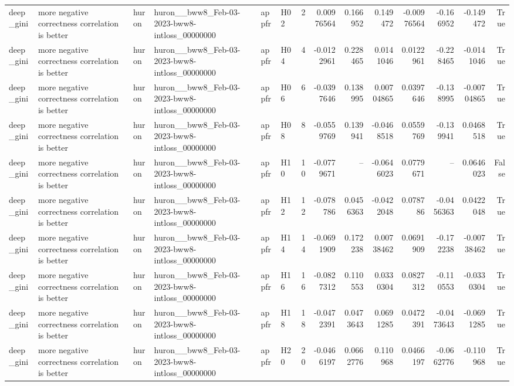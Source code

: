 \begin{longtable}{llllllrrrrrrrr}
deep\_gini & more negative correctness correlation is better & huron & huron\_\_bww8\_Feb-03-2023-bww8-intloss\_00000000 & appfr & H02 & 2 & 0.00976564 & 0.166952 & 0.149472 & -0.00976564 & -0.166952 & -0.149472 & True \\
deep\_gini & more negative correctness correlation is better & huron & huron\_\_bww8\_Feb-03-2023-bww8-intloss\_00000000 & appfr & H04 & 4 & -0.0122961 & 0.228465 & 0.0141046 & 0.0122961 & -0.228465 & -0.0141046 & True \\
deep\_gini & more negative correctness correlation is better & huron & huron\_\_bww8\_Feb-03-2023-bww8-intloss\_00000000 & appfr & H06 & 6 & -0.0397646 & 0.138995 & 0.00704865 & 0.0397646 & -0.138995 & -0.00704865 & True \\
deep\_gini & more negative correctness correlation is better & huron & huron\_\_bww8\_Feb-03-2023-bww8-intloss\_00000000 & appfr & H08 & 8 & -0.0559769 & 0.139941 & -0.0468518 & 0.0559769 & -0.139941 & 0.0468518 & True \\
deep\_gini & more negative correctness correlation is better & huron & huron\_\_bww8\_Feb-03-2023-bww8-intloss\_00000000 & appfr & H10 & 10 & -0.0779671 & -- & -0.0646023 & 0.0779671 & -- & 0.0646023 & False \\
deep\_gini & more negative correctness correlation is better & huron & huron\_\_bww8\_Feb-03-2023-bww8-intloss\_00000000 & appfr & H12 & 12 & -0.078786 & 0.0456363 & -0.0422048 & 0.078786 & -0.0456363 & 0.0422048 & True \\
deep\_gini & more negative correctness correlation is better & huron & huron\_\_bww8\_Feb-03-2023-bww8-intloss\_00000000 & appfr & H14 & 14 & -0.0691909 & 0.172238 & 0.00738462 & 0.0691909 & -0.172238 & -0.00738462 & True \\
deep\_gini & more negative correctness correlation is better & huron & huron\_\_bww8\_Feb-03-2023-bww8-intloss\_00000000 & appfr & H16 & 16 & -0.0827312 & 0.110553 & 0.0330304 & 0.0827312 & -0.110553 & -0.0330304 & True \\
deep\_gini & more negative correctness correlation is better & huron & huron\_\_bww8\_Feb-03-2023-bww8-intloss\_00000000 & appfr & H18 & 18 & -0.0472391 & 0.0473643 & 0.0691285 & 0.0472391 & -0.0473643 & -0.0691285 & True \\
deep\_gini & more negative correctness correlation is better & huron & huron\_\_bww8\_Feb-03-2023-bww8-intloss\_00000000 & appfr & H20 & 20 & -0.0466197 & 0.0662776 & 0.110968 & 0.0466197 & -0.0662776 & -0.110968 & True \\

\end{longtable}
